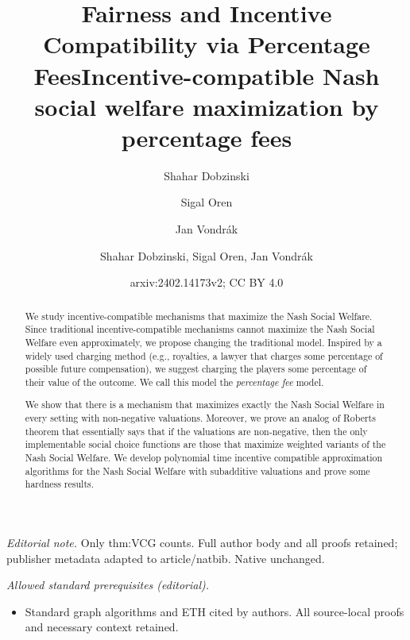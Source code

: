 \documentclass{article}
\author{Shahar Dobzinski \and Sigal Oren \and Jan Vondrák}\date{}
\title{Fairness and Incentive Compatibility via Percentage Fees}
\title{Incentive-compatible Nash social welfare maximization by percentage fees}
\author{Shahar Dobzinski, Sigal Oren, Jan Vondrák}
\date{arxiv:2402.14173v2; CC BY 4.0}
\begin{document}
\maketitle
\noindent\textit{Editorial note.} Only thm:VCG counts. Full author body and all proofs retained; publisher metadata adapted to article/natbib. Native unchanged.\par\medskip
\noindent\textit{Allowed standard prerequisites (editorial).}\begin{itemize}
\item Standard graph algorithms and ETH cited by authors. All source-local proofs and necessary context retained.
\end{itemize}\medskip




\maketitle

\begin{abstract}
We study incentive-compatible mechanisms that maximize the Nash Social Welfare. Since traditional incentive-compatible mechanisms cannot maximize the Nash Social Welfare even approximately, we propose changing the traditional model. Inspired by a widely used charging method (e.g., royalties, a lawyer that charges some percentage of possible future compensation), we suggest charging the players some percentage of their value of the outcome. We call this model the \emph{percentage fee} model.

We show that there is a mechanism that maximizes exactly the Nash Social Welfare in every setting with non-negative valuations. Moreover, we prove an analog of Roberts theorem that essentially says that if the valuations are non-negative, then the only implementable social choice functions are those that maximize weighted variants of the Nash Social Welfare. We develop polynomial time incentive compatible approximation algorithms for the Nash Social Welfare with subadditive valuations and prove some hardness results. 
\end{abstract}
\end{document}
